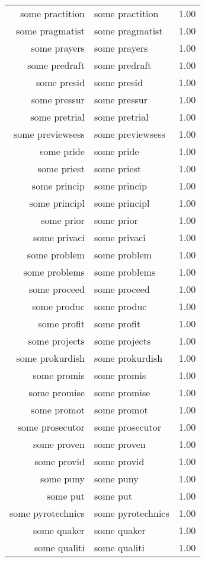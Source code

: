 \begin{table}[ht]
\begin{tabular}{rlr}
  some practition & some practition & 1.00 \\ 
  some pragmatist & some pragmatist & 1.00 \\ 
  some prayers & some prayers & 1.00 \\ 
  some predraft & some predraft & 1.00 \\ 
  some presid & some presid & 1.00 \\ 
  some pressur & some pressur & 1.00 \\ 
  some pretrial & some pretrial & 1.00 \\ 
  some previewsess & some previewsess & 1.00 \\ 
  some pride & some pride & 1.00 \\ 
  some priest & some priest & 1.00 \\ 
  some princip & some princip & 1.00 \\ 
  some principl & some principl & 1.00 \\ 
  some prior & some prior & 1.00 \\ 
  some privaci & some privaci & 1.00 \\ 
  some problem & some problem & 1.00 \\ 
  some problems & some problems & 1.00 \\ 
  some proceed & some proceed & 1.00 \\ 
  some produc & some produc & 1.00 \\ 
  some profit & some profit & 1.00 \\ 
  some projects & some projects & 1.00 \\ 
  some prokurdish & some prokurdish & 1.00 \\ 
  some promis & some promis & 1.00 \\ 
  some promise & some promise & 1.00 \\ 
  some promot & some promot & 1.00 \\ 
  some prosecutor & some prosecutor & 1.00 \\ 
  some proven & some proven & 1.00 \\ 
  some provid & some provid & 1.00 \\ 
  some puny & some puny & 1.00 \\ 
  some put & some put & 1.00 \\ 
  some pyrotechnics & some pyrotechnics & 1.00 \\ 
  some quaker & some quaker & 1.00 \\ 
  some qualiti & some qualiti & 1.00 \\ 

\end{tabular}
\end{table}
